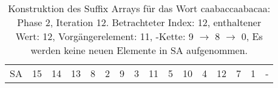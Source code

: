 \begin{table}[H]
\begin{adjustbox}{max width=\textwidth}
\begin{tabular}{lccccccccccccccc}
\multicolumn{1}{l|}{SA}      & \multicolumn{1}{c|}{15} & 14 & \multicolumn{1}{c|}{13} & \multicolumn{1}{c|}{8}     & \multicolumn{1}{c|}{2}      & \multicolumn{1}{c|}{9}    & \multicolumn{1}{c|}{3}     & \multicolumn{1}{c|}{11} & \multicolumn{1}{c|}{5}   & 10 & \multicolumn{1}{c|}{4}  & \cellcolor[HTML]{\green}12 & 7  & 1  & - 
\end{tabular}
\end{adjustbox}

\caption[Konstruktion des Suffix Arrays f{\"u}r das Wort caabaccaabacaa: Phase 2, Iteration 12]{Konstruktion des Suffix Arrays f{\"u}r das Wort caabaccaabacaa: Phase 2, Iteration 12. Betrachteter Index: 12, enthaltener Wert: 12, Vorg{\"a}ngerelement: 11, \prevpointer-Kette: 9 $\rightarrow$ 8 $\rightarrow$ 0, Es werden keine neuen Elemente in SA aufgenommen.}
\label{table_complex_example_2_12} 
\end{table}

